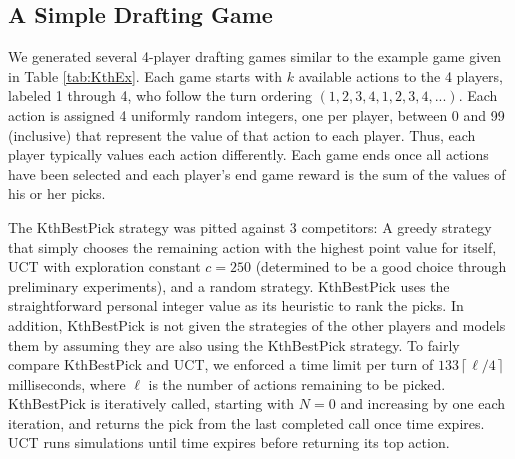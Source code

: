 \documentclass[letterpaper]{article}
\numberwithin{equation}{section}
\numberwithin{theorem}{section}
\numberwithin{lemma}{section}
\numberwithin{df}{section}
\begin{document}
\subsection{A Simple Drafting Game}

We generated several 4-player drafting games similar to the example game given in Table \ref{tab:KthEx}.  Each game starts with $k$ available actions to the 4 players, labeled 1 through 4, who follow the turn ordering $(1,2,3,4,1,2,3,4,...)$.  Each action is assigned 4 uniformly random integers, one per player, between 0 and 99 (inclusive) that represent the value of that action to each player.  Thus, each player typically values each action differently.  Each game ends once all actions have been selected and each player's end game reward is the sum of the values of his or her picks.   

The KthBestPick strategy was pitted against 3 competitors: A greedy strategy that simply chooses the remaining action with the highest point value for itself, UCT with exploration constant $c = 250$ (determined to be a good choice through preliminary experiments), and a random strategy.  KthBestPick uses the straightforward personal integer value as its heuristic to rank the picks.  In addition, KthBestPick is not given the strategies of the other players and models them by assuming they are also using the KthBestPick strategy.  To fairly compare KthBestPick and UCT, we enforced a time limit per turn of $133 \left \lceil \ell / 4 \right \rceil$ milliseconds, where $\ell$ is the number of actions remaining to be picked.  KthBestPick is iteratively called, starting with $N = 0$ and increasing by one each iteration, and returns the pick from the last completed call once time expires.  UCT runs simulations until time expires before returning its top action.
\end{document}
